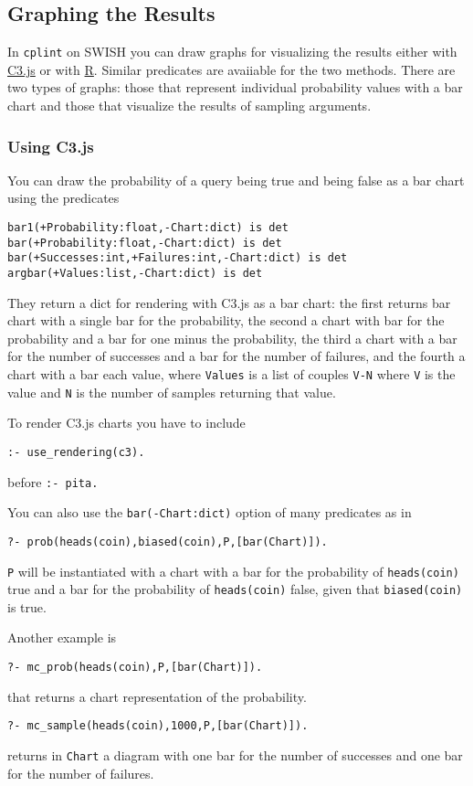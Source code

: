 \subsection{Graphing the Results}
\label{graphing}

In \texttt{cplint} on SWISH you can draw graphs
for visualizing the results either with \href{http://www.c3js.org/}{C3.js} or with \href{https://www.r-project.org/}{R}. Similar predicates are avaiiable for the two methods.
 There are two types
of graphs: those that represent individual probability values with a bar chart and those that
visualize the results of sampling arguments.

\subsubsection{Using C3.js}
You can draw the probability of a query being true and
being false as a bar chart using the predicates
\begin{verbatim}
bar1(+Probability:float,-Chart:dict) is det
bar(+Probability:float,-Chart:dict) is det
bar(+Successes:int,+Failures:int,-Chart:dict) is det
argbar(+Values:list,-Chart:dict) is det
\end{verbatim}
They return  a dict for rendering with C3.js as a bar chart:
the first  returns bar chart with
a single bar for the probability,  the second a chart with
bar for the probability and a bar for one minus the probability,
the third a  chart with
a bar for the number of successes and a bar for the number of failures, and
the fourth a  chart with
a bar each value, where \verb|Values| is a list of couples \verb|V-N| where
  \verb|V| is the value and \verb|N| is the number of samples
  returning that value.
 
To render C3.js charts  you have to include
\begin{verbatim}
:- use_rendering(c3).
\end{verbatim}
before \verb|:- pita.| 

You can also use the  \verb|bar(-Chart:dict)| option of many predicates
as in
\begin{verbatim}
?- prob(heads(coin),biased(coin),P,[bar(Chart)]).
\end{verbatim}
\verb|P| will be instantiated with a
 chart with
a bar for the probability of \verb|heads(coin)| true and a bar for the probability of \verb|heads(coin)| false,
given that \verb|biased(coin)| is true.

Another example is
\begin{verbatim}
?- mc_prob(heads(coin),P,[bar(Chart)]).
\end{verbatim}
that returns a chart representation of the probability.
\begin{verbatim}
?- mc_sample(heads(coin),1000,P,[bar(Chart)]).
\end{verbatim}
returns in \verb|Chart| a diagram with one bar for the number of successes and
one bar for the number of failures.

